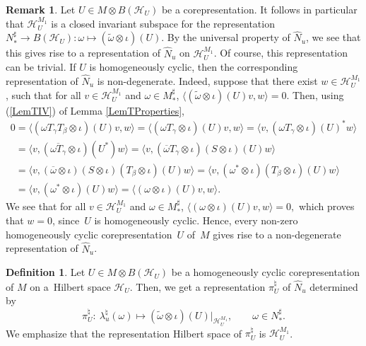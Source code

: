 \documentclass[pdftex]{sigma}
\numberwithin{equation}{section}
\theoremstyle{definition}
\newtheorem{dfn}[thm]{Definition}
\newtheorem{rmk}[thm]{Remark}
\newcommand{\cHil}{\mathcal{H}}
\begin{document}
\begin{rmk}\label{RmkInvSubs}
Let $U \in M \otimes B(\cHil_U)$ be a corepresentation. It follows in particular that $\cHil_U^{M_1}$ is a closed invariant subspace for the  representation $N_\ast^\sharp \rightarrow B(\cHil_U): \omega \mapsto (\tilde{\omega} \otimes \iota)(U)$. By the universal property of $\hat{N}_u$, we see that this gives rise to a representation of $\hat{N}_u$ on $\cHil_U^{M_1}$. Of course, this representation can be trivial. If $U$ is homogeneously cyclic, then the corresponding representation of $\hat{N}_u$ is non-degenerate.  Indeed, suppose that there exist $w \in \cHil_U^{M_1}$, such that for all $v \in \cHil_U^{M_1}$ and $\omega \in M_\ast^\sharp$, $  \langle (\tilde{\omega} \otimes \iota )(U) v, w \rangle =0 $. Then, using (\ref{LemTIV}) of Lemma \ref{LemTProperties},
\begin{gather*}
0 = \langle (\omega  T_\gamma T_\beta \otimes \iota)(U) v, w \rangle =
\langle (\omega T_\gamma  \otimes \iota)(U) v, w \rangle =
\langle  v, (\omega  T_\gamma  \otimes \iota)(U)^\ast w \rangle  \\
\phantom{0}{} =  \langle  v, (\overline{\omega  T_\gamma}  \otimes \iota)(U^\ast) w \rangle =
\langle  v, (\overline{\omega}  T_\gamma  \otimes \iota)(S \otimes \iota)(U) w \rangle  \\
\phantom{0}{} =  \langle  v, (\overline{\omega} \otimes \iota) (S \otimes \iota) (T_\beta \otimes \iota)(U) w \rangle =
 \langle  v, (\omega^\ast  \otimes \iota)(T_\beta \otimes \iota)(U) w\rangle  \\
\phantom{0}{} =  \langle  v, (\omega^\ast  \otimes \iota)(U) w \rangle =
\langle (\omega  \otimes \iota)(U)  v,  w \rangle.
\end{gather*}
We see that for all $v \in \cHil_U^{M_1}$ and $\omega \in M_\ast^\sharp$,
$  \langle (\omega \otimes \iota )(U) v, w \rangle =0,$
which proves that $w = 0$, since~$U$ is homogeneously cyclic. Hence, every non-zero homogeneously cyclic corepresentation~$U$ of~$M$ gives rise to a  non-degenerate representation of $\hat{N}_u$.
\end{rmk}

\begin{dfn}\label{DfnRep}
Let $U \in M \otimes B(\cHil_U)$ be a homogeneously cyclic corepresentation of $M$ on a~Hilbert space $\cHil_U$. Then, we get a representation $\pi_U^\natural$ of $\hat{N}_u$ determined by
\[
\pi_U^\natural: \ \lambda_u^\natural(\omega) \mapsto (\tilde{\omega} \otimes \iota)(U) \vert_{\cHil_{U}^{M_1}}, \qquad \omega \in N_\ast^\sharp.
\]
 We emphasize that the representation Hilbert space of $\pi_U^\natural$ is $\cHil_U^{M_1}$.
\end{dfn}
\end{document}
